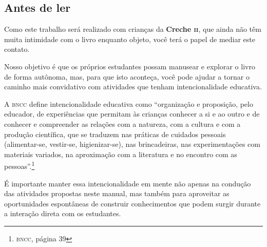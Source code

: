 \documentclass[11pt]{extarticle}
\begin{document}
\subsection{Antes de ler}


Como este trabalho será realizado com crianças da \textbf{Creche \textsc{ii}}, 
que ainda não têm muita intimidade com o livro enquanto objeto, você terá o 
papel de mediar este contato. 

Nosso objetivo é que os próprios estudantes possam manusear 
e explorar o livro de forma autônoma, mas, para que isto aconteça, você 
pode ajudar a tornar o caminho mais convidativo com atividades que tenham 
intencionalidade educativa. 

A \textsc{bncc} define intencionalidade educativa como ``organização 
e proposição, pelo educador, de experiências que permitam às crianças 
conhecer a si e ao outro e de conhecer e compreender as relações com a 
natureza, com a cultura e com a produção científica, que se traduzem nas 
práticas de cuidados pessoais (alimentar-se, vestir-se, higienizar-se), 
nas brincadeiras, nas experimentações com materiais 
variados, na aproximação com a literatura e no encontro com as 
pessoas''.\footnote{\textsc{bncc}, página 39}

É importante manter essa intencionalidade em mente não apenas na condução 
das atividades propostas neste manual, mas também para aproveitar as 
oportunidades espontâneas de construir conhecimentos que podem surgir durante 
a interação direta com os estudantes.
\end{document}
